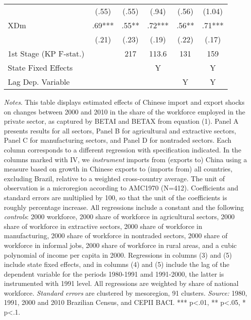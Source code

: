 \begin{center}
\begin{table}[h!]
\begin{center}
\begin{centering}
\begin{tabular}{lccccc}
 & {\scriptsize{}(.55)} & {\scriptsize{}(.55)} & {\scriptsize{}(.94)} & {\scriptsize{}(.56)} & {\scriptsize{}(1.04)}\tabularnewline
{\footnotesize{}XDm} & {\footnotesize{} .69***} & {\footnotesize{} .55**} & {\footnotesize{} .72***} & {\footnotesize{} .56**} & {\footnotesize{} .71***}\tabularnewline
 & {\scriptsize{}(.21)} & {\scriptsize{}(.23)} & {\scriptsize{}(.19)} & {\scriptsize{}(.22)} & {\scriptsize{}(.17)}\tabularnewline
{\scriptsize{}1st Stage (KP F-stat.)} &  & {\scriptsize{} 217} & {\scriptsize{} 113.6} & {\scriptsize{} 131} & {\scriptsize{} 159}\tabularnewline
\hline 
{\scriptsize{}State Fixed Effects} &  &  & {\scriptsize{}Y} &  & {\scriptsize{}Y}\tabularnewline
{\scriptsize{}Lag Dep. Variable} &  &  &  & {\scriptsize{}Y} & {\scriptsize{}Y}\tabularnewline
\hline 
\end{tabular}
\par\end{centering}
\medskip
\end{center}
\footnotesize
\emph{Notes}. This table displays estimated effects of Chinese import and export shocks on changes between 2000 and 2010 in the share of the workforce employed in the private sector, as captured by BETAI and BETAX from equation (1). Panel A presents results for all sectors, Panel B for agricultural and extractive sectors, Panel C for manufacturing sectors, and Panel D for nontraded sectors. Each column corresponds to a different regression with specification indicated. In the columns marked with IV, we \emph{instrument} imports from (exports to) China using a measure based on growth in Chinese exports to (imports from) all countries, excluding Brazil, relative to a weighted cross-country average. The unit of observation is a microregion according to AMC1970 (N=412). Coefficients and standard errors are multiplied by 100, so that the unit of the coefficients is roughly percentage increase. All regressions include a constant and the following \emph{controls}: 2000 workforce, 2000 share of workforce in agricultural sectors, 2000 share of workforce in extractive sectors, 2000 share of workforce in manufacturing, 2000 share of workforce in nontraded sectors, 2000 share of workforce in informal jobs, 2000 share of workforce in rural areas, and a cubic polynomial of income per capita in 2000. Regressions in columns (3) and (5) include state fixed effects, and in columns (4) and (5) include the lag of the dependent variable for the periods 1980-1991 amd 1991-2000, the latter is instrumented with 1991 level. All regressions are weighted by share of national workforce.
 \emph{Standard errors} are clustered by mesoregion, 91 clusters. \emph{Source:} 1980, 1991, 2000 and 2010 Brazilian Census, and CEPII BACI. *** p<.01, ** p<.05, * p<.1.
\end{table}
\par \end{center}
